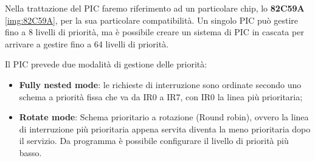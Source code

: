 Nella trattazione del PIC faremo riferimento ad un particolare chip, lo \textbf{82C59A} \ref{img:82C59A}, per la sua particolare compatibilità. Un singolo PIC può gestire fino a 8 livelli di priorità, ma è possibile creare un sistema di PIC in cascata per arrivare a gestire fino a 64 livelli di priorità. 

Il PIC prevede due modalità di gestione delle priorità:
\begin{itemize}
    \item \textbf{Fully nested mode}: le richieste di interruzione sono ordinate secondo uno schema a priorità fissa che va da IR0 a IR7, con IR0 la linea più prioritaria;
    \item \textbf{Rotate mode}: Schema prioritario a rotazione (Round robin), ovvero la linea di interruzione più prioritaria appena servita diventa la meno prioritaria dopo il servizio. Da programma è possibile configurare il livello di priorità più basso.
\end{itemize}

